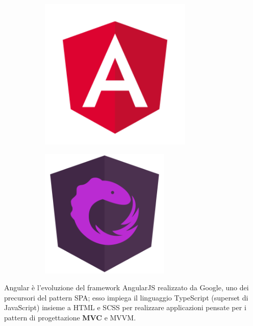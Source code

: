 \begin{figure}
  \centering
  \begin{subfigure}[b]{0.45\textwidth}
    \centering
    \includegraphics[width=0.8\textwidth]{res/angular.png}%
    \label{subfig:sp3:ng}
  \end{subfigure}
  \hfill
  \begin{subfigure}[b]{0.45\textwidth}
    \centering
    \includegraphics[width=0.68\textwidth]{res/ngrx.png}%
    \label{subfig:sp3:ngrx}
  \end{subfigure}%
  \label{fig:sp3:angular}
\end{figure}

Angular è l'evoluzione del framework AngularJS realizzato da Google, uno dei precursori del pattern SPA\@;
esso impiega il linguaggio TypeScript (superset di JavaScript) insieme a HTML e SCSS per realizzare applicazioni pensate per i pattern di progettazione \textbf{MVC} e MVVM\@.

